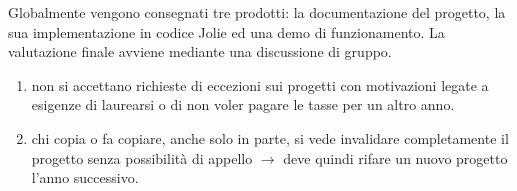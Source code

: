 Globalmente vengono consegnati tre prodotti: la documentazione del progetto, la sua implementazione in codice Jolie ed una demo di funzionamento. La valutazione finale avviene mediante una discussione di gruppo.
\begin{tcolorbox}[colback=yellow!20!white,colframe=yellow!75!black,title=\textbf{N.B.}]
 \begin{enumerate}
  \item non si accettano richieste di eccezioni sui progetti con motivazioni legate a esigenze di laurearsi o di non voler pagare le tasse per un altro anno.
  \item chi copia o fa copiare, anche solo in parte, si vede invalidare completamente il progetto senza possibilità di appello $\rightarrow$ deve quindi rifare un nuovo progetto l'anno successivo.
 \end{enumerate}
\end{tcolorbox}

